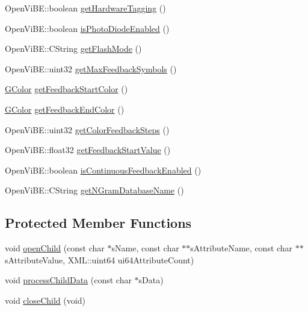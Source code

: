 \begin{DoxyCompactItemize}
\item 
OpenViBE::boolean \hyperlink{classOpenViBEApplications_1_1P300InterfacePropertyReader_a3cb0be47e99058296d3a56ebb441ac31}{getHardwareTagging} ()
\item 
OpenViBE::boolean \hyperlink{classOpenViBEApplications_1_1P300InterfacePropertyReader_acd9048bc3602e029ec415845c65d005b}{isPhotoDiodeEnabled} ()
\item 
OpenViBE::CString \hyperlink{classOpenViBEApplications_1_1P300InterfacePropertyReader_a096f7e00e3d57be6f13b23bc67bbc1f6}{getFlashMode} ()
\item 
OpenViBE::uint32 \hyperlink{classOpenViBEApplications_1_1P300InterfacePropertyReader_af038eb8711ae9d91ba78146eae2d24cc}{getMaxFeedbackSymbols} ()
\item 
\hyperlink{structOpenViBEApplications_1_1GColor}{GColor} \hyperlink{classOpenViBEApplications_1_1P300InterfacePropertyReader_a435347b2f653336cfe5395da4ea9eb9e}{getFeedbackStartColor} ()
\item 
\hyperlink{structOpenViBEApplications_1_1GColor}{GColor} \hyperlink{classOpenViBEApplications_1_1P300InterfacePropertyReader_ab9f08bf826d642a760d292e9723e5792}{getFeedbackEndColor} ()
\item 
OpenViBE::uint32 \hyperlink{classOpenViBEApplications_1_1P300InterfacePropertyReader_aaecf44c9df9606bb43cf4cf67a185b9b}{getColorFeedbackSteps} ()
\item 
OpenViBE::float32 \hyperlink{classOpenViBEApplications_1_1P300InterfacePropertyReader_a2d4bdce4bedb24e07ec4b9634a7549d3}{getFeedbackStartValue} ()
\item 
OpenViBE::boolean \hyperlink{classOpenViBEApplications_1_1P300InterfacePropertyReader_a4d3419ad4c669edacc01b7372494c4fa}{isContinuousFeedbackEnabled} ()
\item 
OpenViBE::CString \hyperlink{classOpenViBEApplications_1_1P300InterfacePropertyReader_afce26c3358a3e607f5f770f9f415c204}{getNGramDatabaseName} ()
\end{DoxyCompactItemize}
\subsection*{Protected Member Functions}
\begin{DoxyCompactItemize}
\item 
void \hyperlink{classOpenViBEApplications_1_1P300InterfacePropertyReader_acf3e4c17683b6f9c7e1ae57fd3d4c2ce}{openChild} (const char $\ast$sName, const char $\ast$$\ast$sAttributeName, const char $\ast$$\ast$sAttributeValue, XML::uint64 ui64AttributeCount)
\item 
void \hyperlink{classOpenViBEApplications_1_1P300InterfacePropertyReader_a8ea3d7870d0986c734459016b1ff0cd3}{processChildData} (const char $\ast$sData)
\item 
void \hyperlink{classOpenViBEApplications_1_1P300InterfacePropertyReader_ae3adb6d018131428c4dbda2123307d1f}{closeChild} (void)
\end{DoxyCompactItemize}
